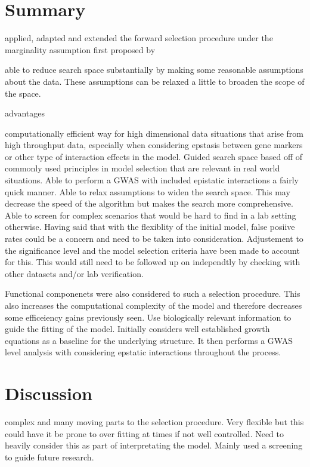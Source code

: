 \documentclass[11pt,]{book}
\theoremstyle{definition}
\theoremstyle{definition}
\theoremstyle{remark}
\begin{document}
\section{Summary}\label{summary}

applied, adapted and extended the forward selection procedure under the
marginality assumption first proposed by \cite{hao2014interaction}

able to reduce search space substantially by making some reasonable
assumptions about the data. These assumptions can be relaxed a little to
broaden the scope of the space.

advantages

computationally efficient way for high dimensional data situations that
arise from high throughput data, especially when considering epstasis
between gene markers or other type of interaction effects in the model.
Guided search space based off of commonly used principles in model
selection that are relevant in real world situations. Able to perform a
GWAS with included epistatic interactions a fairly quick manner. Able to
relax assumptions to widen the search space. This may decrease the speed
of the algorithm but makes the search more comprehensive. Able to screen
for complex scenarios that would be hard to find in a lab setting
otherwise. Having said that with the flexiblity of the initial model,
false posiive rates could be a concern and need to be taken into
consideration. Adjustement to the significance level and the model
selection criteria have been made to account for this. This would still
need to be followed up on independtly by checking with other datasets
and/or lab verification.

Functional componenets were also considered to such a selection
procedure. This also increases the computational complexity of the model
and therefore decreases some efficeiency gains previously seen. Use
biologically relevant information to guide the fitting of the model.
Initially considers well established growth equations as a baseline for
the underlying structure. It then performs a GWAS level analysis with
considering epstatic interactions throughout the process.

\section{Discussion}\label{discussion-3}

complex and many moving parts to the selection procedure. Very flexible
but this could have it be prone to over fitting at times if not well
controlled. Need to heavily consider this as part of interpretating the
model. Mainly used a screening to guide future research.
\end{document}
